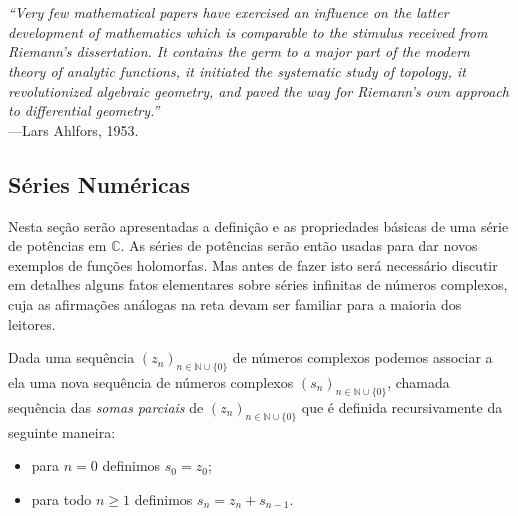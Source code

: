 \chapter[Semana 5]{}
\chaptermark{}


\hfill%
\begin{minipage}{12cm}
	\begin{flushright}
		\rightskip=0.5cm
		\textit{``Very few mathematical papers have exercised an influence on 
		the latter development of mathematics which is comparable to the stimulus
		received from Riemann's dissertation. It contains the germ to a major part
		of the modern theory of analytic functions, it initiated the systematic
		study of topology, it revolutionized algebraic geometry, and paved the way
		for Riemann's own approach to differential geometry.''}
		\\[0.1cm]
		\rightskip=0.5cm
		---Lars Ahlfors, 1953.
	\end{flushright}
\end{minipage}





\section{Séries Numéricas}

Nesta seção serão apresentadas a definição e as propriedades básicas de uma
série de potências em $\mathbb{C}$. As séries de potências serão então usadas
para dar novos exemplos de funções holomorfas. Mas antes de fazer isto será 
necessário discutir em detalhes alguns fatos elementares sobre séries infinitas
de números complexos, cuja as afirmações análogas na reta devam ser familiar 
para a maioria dos leitores. 



\bigskip 

Dada uma sequência $(z_n)_{n\in\mathbb{N}\cup\{0\}}$ de números complexos podemos associar a ela 
uma nova sequência de números complexos $(s_n)_{n\in\mathbb{N}\cup\{0\}}$, chamada sequência das \textit{somas parciais}
de $(z_n)_{n\in\mathbb{N}\cup\{0\}}$ que é definida recursivamente da seguinte maneira: 
\begin{itemize}
	\item para $n=0$ definimos $s_0 = z_0$;
	\item para todo $n\geqslant 1$ definimos $s_{n}=z_n+s_{n-1}$.
\end{itemize}

